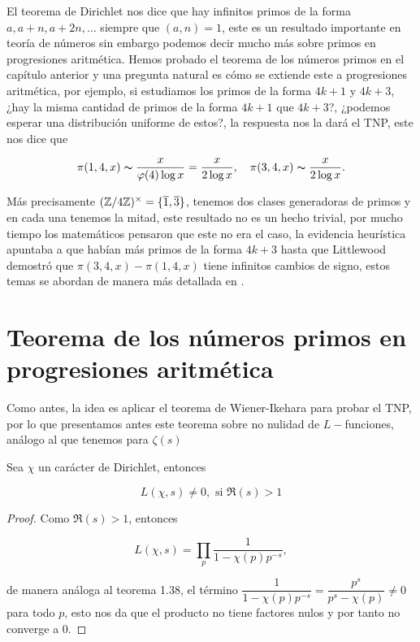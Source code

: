 
\thispagestyle{empty}
\vspace{-0.5cm}


El teorema de Dirichlet nos dice que hay infinitos primos de la forma $a,a+n , a+2n,\ldots$ siempre que $(a,n)=1$, este es un resultado importante en teoría de números sin embargo podemos decir mucho más sobre primos en progresiones aritmética. Hemos probado el teorema de los números primos en el capítulo anterior y una pregunta natural es cómo se extiende este a progresiones aritmética, por ejemplo, si estudiamos los primos de la forma $4k+1$ y $4k+3$, ¿hay la misma cantidad de primos de la forma $4k+1$ que $4k+3$?, ¿podemos esperar una distribución uniforme de estos?, la respuesta nos la dará el TNP, este nos dice que

$$\pi(1,4,x)\thicksim \frac{x}{\varphi(4)\log x}=\frac{x}{2\log x},\quad \pi(3,4,x)\thicksim \frac{x}{2\log x}.$$

Más precisamente $(\mathbb{Z}/4\mathbb{Z})^\times=\{\overline{1},\overline{3}\}$, tenemos dos clases generadoras de primos y en cada una tenemos la mitad, este resultado no es un hecho trivial, por mucho tiempo los matemáticos pensaron que este no era el caso, la evidencia heurística apuntaba a que habían más primos de la forma $4k+3$ hasta que Littlewood demostró que $\pi(3,4,x)-\pi(1,4,x)$ tiene infinitos cambios de signo, estos temas se abordan de manera más detallada en \cite{granville2006prime}.
\section{Teorema de los números primos en progresiones aritmética}

Como antes, la idea es aplicar el teorema de Wiener-Ikehara para probar el TNP, por lo que presentamos antes este teorema sobre no nulidad de $L-$funciones, análogo al que tenemos para $\zeta(s)$

\begin{theorem}
    Sea $\chi$ un carácter de Dirichlet, entonces

    $$L(\chi,s)\neq 0, \text{ si }\Re(s)>1$$
\end{theorem}

\begin{proof}
    Como $\Re(s)>1$, entonces

    $$L(\chi,s)=\prod_p\frac{1}{1-\chi(p)p^{-s}},$$

    de manera análoga al teorema 1.38, el término $\dfrac{1}{1-\chi(p)p^{-s}}=\dfrac{p^s}{p^s-\chi(p)}\neq 0$ para todo $p$, esto nos  da que el producto no tiene factores nulos y por tanto no converge a 0.
\end{proof}

